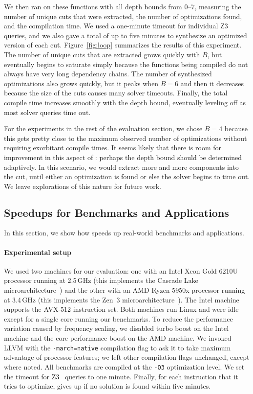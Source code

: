 We then ran \minotaur{} on these functions with all depth bounds from
0--7, measuring the number of unique cuts that were extracted, the
number of optimizations found, and the compilation time.
%
We used a one-minute timeout for individual Z3 queries, and we also
gave \minotaur{} a total of up to five minutes to synthesize an optimized
version of each cut.
%
Figure~\ref{fig:loop} summarizes the results of this experiment.
%
The number of unique cuts that are extracted grows quickly with $B$,
but eventually begins to saturate simply because the functions being
compiled do not always have very long dependency chains.
%
The number of synthesized optimizations also grows quickly, but it
peaks when $B=6$ and then it decreases because the size of the cuts
causes many solver timeouts.
%
Finally, the total compile time increases smoothly with the depth
bound, eventually leveling off as most solver queries time out.


For the experiments in the rest of the evaluation section, we chose
$B=4$ because this gets pretty close to the maximum observed number of
optimizations without requiring exorbitant compile times.
%
It seems likely that there is room for improvement in this aspect of
\minotaur: perhaps the depth bound should be determined adaptively.
%
In this scenario, we would extract more and more components into the
cut, until either an optimization is found or else the solver begins
to time out.
%
We leave explorations of this nature for future work.


\subsection{Speedups for Benchmarks and Applications}

In this section, we show how \minotaur{} speeds up real-world benchmarks
and applications.

\paragraph{Experimental setup}
%
We used two machines for our evaluation: one with an Intel Xeon Gold
6210U processor running at 2.5\,GHz (this implements the Cascade Lake
microarchitecture~\cite{cascadelake}) and the other with an
AMD Ryzen 5950x processor
running at 3.4\,GHz (this implements the Zen~3 microarchitecture~\cite{zen3}).
The Intel machine supports the AVX-512 instruction set.
%
Both machines run Linux and were idle except for a single core running
our benchmarks.
%
To reduce the performance variation caused by frequency scaling, we
disabled turbo boost on the Intel machine and the core performance
boost on the AMD machine.
%
We invoked LLVM with the \texttt{-march=native} compilation flag to
ask it to take maximum advantage of processor features; we left other
compilation flags unchanged, except where noted.
%
All benchmarks are compiled at the \texttt{-O3} optimization level.
%
We set the timeout for Z3~\cite{z3} queries to one minute.
%
Finally, for each instruction that it tries to optimize, \minotaur{} gives
up if no solution is found within five minutes.


